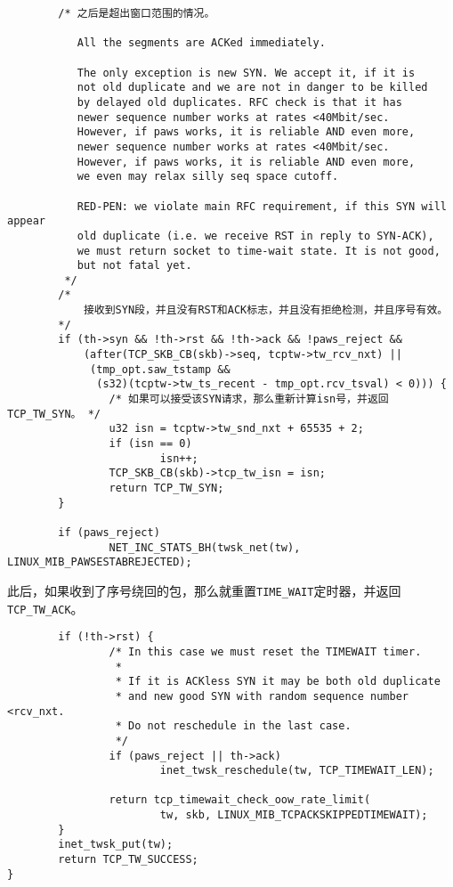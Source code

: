 \begin{verbatim}
        /* 之后是超出窗口范围的情况。

           All the segments are ACKed immediately.

           The only exception is new SYN. We accept it, if it is
           not old duplicate and we are not in danger to be killed
           by delayed old duplicates. RFC check is that it has
           newer sequence number works at rates <40Mbit/sec.
           However, if paws works, it is reliable AND even more,
           newer sequence number works at rates <40Mbit/sec.
           However, if paws works, it is reliable AND even more,
           we even may relax silly seq space cutoff.

           RED-PEN: we violate main RFC requirement, if this SYN will appear
           old duplicate (i.e. we receive RST in reply to SYN-ACK),
           we must return socket to time-wait state. It is not good,
           but not fatal yet.
         */
		/*
			接收到SYN段，并且没有RST和ACK标志，并且没有拒绝检测，并且序号有效。
		*/
        if (th->syn && !th->rst && !th->ack && !paws_reject &&
            (after(TCP_SKB_CB(skb)->seq, tcptw->tw_rcv_nxt) ||
             (tmp_opt.saw_tstamp &&
              (s32)(tcptw->tw_ts_recent - tmp_opt.rcv_tsval) < 0))) {
                /* 如果可以接受该SYN请求，那么重新计算isn号，并返回TCP_TW_SYN。 */
                u32 isn = tcptw->tw_snd_nxt + 65535 + 2;
                if (isn == 0)
                        isn++;
                TCP_SKB_CB(skb)->tcp_tw_isn = isn;
                return TCP_TW_SYN;
        }

        if (paws_reject)
                NET_INC_STATS_BH(twsk_net(tw), LINUX_MIB_PAWSESTABREJECTED);
\end{verbatim}
此后，如果收到了序号绕回的包，那么就重置\texttt{TIME_WAIT}定时器，并返回
\texttt{TCP_TW_ACK}。
\begin{verbatim}
        if (!th->rst) {
                /* In this case we must reset the TIMEWAIT timer.
                 *
                 * If it is ACKless SYN it may be both old duplicate
                 * and new good SYN with random sequence number <rcv_nxt.
                 * Do not reschedule in the last case.
                 */
                if (paws_reject || th->ack)
                        inet_twsk_reschedule(tw, TCP_TIMEWAIT_LEN);

                return tcp_timewait_check_oow_rate_limit(
                        tw, skb, LINUX_MIB_TCPACKSKIPPEDTIMEWAIT);
        }
        inet_twsk_put(tw);
        return TCP_TW_SUCCESS;
}
\end{verbatim}

